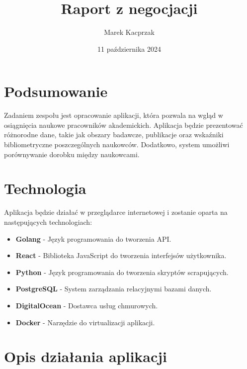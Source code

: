 \documentclass{article}
\title{Raport z negocjacji}
\author{Marek Kacprzak}
\date{11 października 2024}
\begin{document}
\maketitle

\tableofcontents

\section{Podsumowanie}
Zadaniem zespołu jest opracowanie aplikacji, która pozwala na wgląd w osiągnięcia naukowe pracowników akademickich. Aplikacja będzie prezentować różnorodne dane, takie jak obszary badawcze, publikacje oraz wskaźniki bibliometryczne poszczególnych naukowców. Dodatkowo, system umożliwi porównywanie dorobku między naukowcami.

\section{Technologia}
Aplikacja będzie działać w przeglądarce internetowej i zostanie oparta na następujących technologiach:
\begin{itemize}
  \item \textbf{Golang} - Język programowania do tworzenia API.
  \item \textbf{React} - Biblioteka JavaScript do tworzenia interfejsów użytkownika.
  \item \textbf{Python} - Język programowania do tworzenia skryptów scrapujących.
  \item \textbf{PostgreSQL} - System zarządzania relacyjnymi bazami danych.
  \item \textbf{DigitalOcean} - Dostawca usług chmurowych.
  \item \textbf{Docker} - Narzędzie do virtualizacji aplikacji.
\end{itemize}

\section{Opis działania aplikacji}
\end{document}
